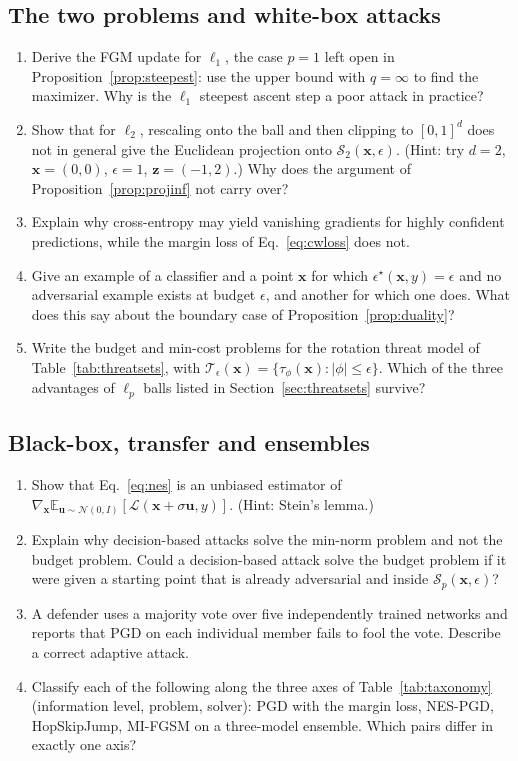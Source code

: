 \documentclass[10pt,a4paper]{extarticle}
\theoremstyle{definition}
\newcommand{\Loss}{\mathcal{L}}
\newcommand{\x}{\mathbf{x}}
\newcommand{\T}{\mathcal{T}}
\begin{document}
\subsection*{The two problems and white-box attacks}

\begin{enumerate}[label=\textbf{\arabic*.}]
  \item\label{ex:l1} Derive the FGM update for \(\ell_1\), the case \(p=1\) left open in Proposition~\ref{prop:steepest}: use the upper bound with \(q=\infty\) to find the maximizer. Why is the \(\ell_1\) steepest ascent step a poor attack in practice?
  \item\label{ex:proj} Show that for \(\ell_2\), rescaling onto the ball and then clipping to \([0,1]^d\) does not in general give the Euclidean projection onto \(\mathcal{S}_2(\x,\epsilon)\). (Hint: try \(d=2\), \(\x=(0,0)\), \(\epsilon=1\), \(\mathbf{z}=(-1,2)\).) Why does the argument of Proposition~\ref{prop:projinf} not carry over?
  \item Explain why cross-entropy may yield vanishing gradients for highly confident predictions, while the margin loss of Eq.~\eqref{eq:cwloss} does not.
  \item Give an example of a classifier and a point \(\x\) for which \(\epsilon^\star(\x,y)=\epsilon\) and no adversarial example exists at budget \(\epsilon\), and another for which one does. What does this say about the boundary case of Proposition~\ref{prop:duality}?
  \item Write the budget and min-cost problems for the rotation threat model of Table~\ref{tab:threatsets}, with \(\T_\epsilon(\x)=\{\tau_\phi(\x):|\phi|\le\epsilon\}\). Which of the three advantages of \(\ell_p\) balls listed in Section~\ref{sec:threatsets} survive?
\end{enumerate}

\subsection*{Black-box, transfer and ensembles}

\begin{enumerate}[label=\textbf{\arabic*.},resume]
  \item Show that Eq.~\eqref{eq:nes} is an unbiased estimator of \(\nabla_{\x}\mathbb{E}_{\mathbf{u}\sim\mathcal{N}(0,I)}[\Loss(\x+\sigma\mathbf{u},y)]\). (Hint: Stein's lemma.)
  \item Explain why decision-based attacks solve the min-norm problem and not the budget problem. Could a decision-based attack solve the budget problem if it were given a starting point that is already adversarial and inside \(\mathcal{S}_p(\x,\epsilon)\)?
  \item A defender uses a majority vote over five independently trained networks and reports that PGD on each individual member fails to fool the vote. Describe a correct adaptive attack.
  \item Classify each of the following along the three axes of Table~\ref{tab:taxonomy} (information level, problem, solver): PGD with the margin loss, NES-PGD, HopSkipJump, MI-FGSM on a three-model ensemble. Which pairs differ in exactly one axis?
\end{enumerate}
\end{document}
